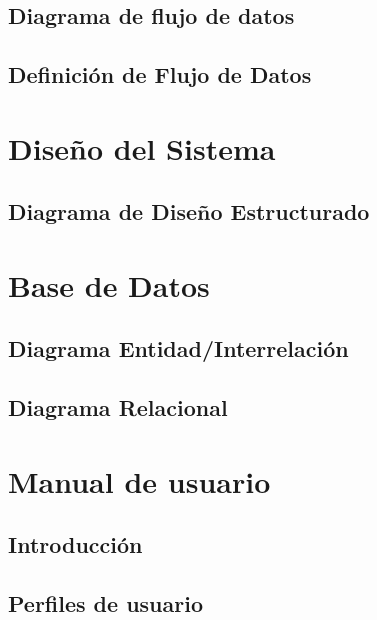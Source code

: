 \documentclass[a4paper,12pt,spanish,twoside]{article}
\begin{document}
\subsection{Diagrama de flujo de datos}


\subsection{Definición de Flujo de Datos}
%

\section{Diseño del Sistema}
\subsection{Diagrama de Diseño Estructurado}

\section{Base de Datos}
\subsection{Diagrama Entidad/Interrelación}
\subsection{Diagrama Relacional}

\section{Manual de usuario}
\subsection{Introducción}
\subsection{Perfiles de usuario}
\end{document}
